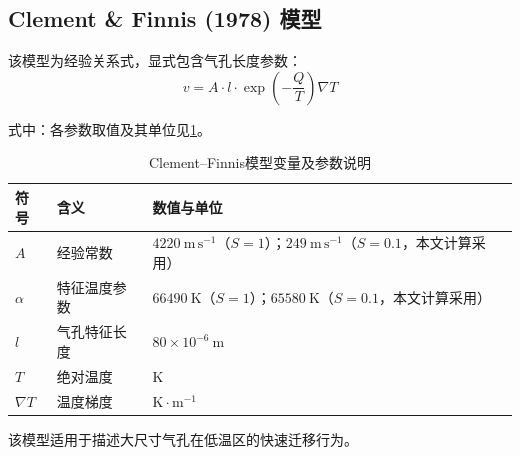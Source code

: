 \subsection{Clement \& Finnis (1978) 模型}

该模型为经验关系式，显式包含气孔长度参数：
\begin{equation}
	v = A \cdot l \cdot \exp\left(-\frac{Q}{T}\right) \nabla T
	\label{eq:app_b_clement_finnis_migration_velocity}
\end{equation}

\noindent 式中：各参数取值及其单位见\tablename\ref{tab:app_b_clement_parameters}。
\begin{table}[H]
	\centering
	\caption{Clement--Finnis模型变量及参数说明}
	\label{tab:app_b_clement_parameters}
	\begin{tabularx}{\textwidth}{>{\centering\arraybackslash\hsize=0.8\hsize}X 
			>{\RaggedRight\arraybackslash\hsize=1.0\hsize}X 
			>{\RaggedRight\arraybackslash\hsize=1.2\hsize}X}
		\toprule
		符号 & 含义 & 数值与单位 \\
		\midrule
		$A$ 
		& 经验常数 
		& $4220~\mathrm{m\,s^{-1}}$（$S=1$）；$249~\mathrm{m\,s^{-1}}$（$S=0.1$，本文计算采用） \\
		
		$\alpha$ 
		& 特征温度参数 
		& $66490~\mathrm{K}$（$S=1$）；$65580~\mathrm{K}$（$S=0.1$，本文计算采用） \\
		
		$l$ 
		& 气孔特征长度 
		& $80 \times 10^{-6}\ \mathrm{m}$ \\
		
		$T$ 
		& 绝对温度 
		& $\mathrm{K}$ \\
		
		$\nabla T$ 
		& 温度梯度 
		& $\mathrm{K\cdot m^{-1}}$ \\
		\bottomrule
	\end{tabularx}
\end{table}

该模型适用于描述大尺寸气孔在低温区的快速迁移行为。
